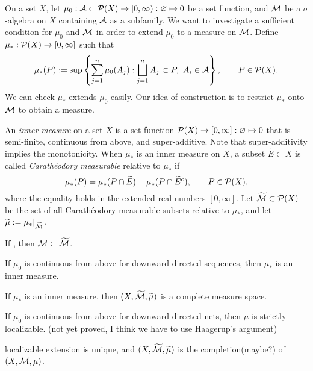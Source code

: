 \documentclass{../../large}
\begin{document}
\begin{prb}
On a set $X$, let $\mu_0:\mathcal{A}\subset\mathcal{P}(X)\to[0,\infty):\varnothing\mapsto0$ be a set function, and $\mathcal{M}$ be a $\sigma$-algebra on $X$ containing $\mathcal{A}$ as a subfamily.
We want to investigate a sufficient condition for $\mu_0$ and $\mathcal{M}$ in order to extend $\mu_0$ to a measure on $\mathcal{M}$.
Define $\mu_*:\mathcal{P}(X)\to[0,\infty]$ such that
\[\mu_*(P):=\sup\left\{\sum_{j=1}^n\mu_0(A_j):\bigsqcup_{j=1}^nA_j\subset P,\ A_i\in\mathcal{A}\right\},\qquad P\in\mathcal{P}(X).\]
We can check $\mu_*$ extends $\mu_0$ easily.
Our idea of construction is to restrict $\mu_*$ onto $\mathcal{M}$ to obtain a measure.

An \emph{inner measure} on a set $X$ is a set function $\mathcal{P}(X)\to[0,\infty]:\varnothing\mapsto0$ that is semi-finite, continuous from above, and super-additive.
Note that super-additivity implies the monotonicity.
When $\mu_*$ is an inner measure on $X$, a subset $\tilde E\subset X$ is called \emph{Carath\'eodory measurable} relative to $\mu_*$ if
\[\mu_*(P)=\mu_*(P\cap\widetilde E)+\mu_*(P\cap\widetilde E^c),\qquad P\in\mathcal{P}(X),\]
where the equality holds in the extended real numbers $[0,\infty]$.
Let $\widetilde{\mathcal{M}}\subset\mathcal{P}(X)$ be the set of all Carath\'eodory measurable subsets relative to $\mu_*$, and let $\widetilde\mu:=\mu_*|_{\widetilde{\mathcal{M}}}$.
\begin{parts}
\item If , then $\mathcal{M}\subset\widetilde{\mathcal{M}}$.
\item If $\mu_0$ is continuous from above for downward directed sequences, then $\mu_*$ is an inner measure.
\item If $\mu_*$ is an inner measure, then $(X,\widetilde{\mathcal{M}},\widetilde\mu)$ is a complete measure space.
\item If $\mu_0$ is continuous from above for downward directed nets, then $\mu$ is strictly localizable. (not yet proved, I think we have to use Haagerup's argument)
\item localizable extension is unique, and $(X,\widetilde{\mathcal{M}},\widetilde\mu)$ is the completion(maybe?) of $(X,\mathcal{M},\mu)$.
\end{parts}
\end{prb}
\end{document}
